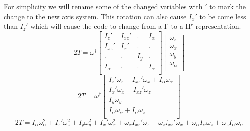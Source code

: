 \documentclass{article}
\begin{document}
For simplicity we will rename some of the changed variables with $'$ to mark the change to the new axis system. This rotation can also cause $I_{x}'$ to be come less than $I_{z}'$ which will cause the code to change from a I$^{r}$ to a II$^{r}$ representation.
\begin{equation}
	2T = \omega^{\dagger}
	\begin{bmatrix}
		I_{z}' & I_{xz}' & . & I_{\alpha} \\
		I_{xz}' & I_{x}' & . & . \\
		. & . & I_{y} & . \\
		I_{\alpha} & . & . & I_{\alpha} \\
	\end{bmatrix}
	\begin{bmatrix}
		\omega_{z} \\
		\omega_{x} \\
		\omega_{y} \\
		\omega_{\alpha} \\
	\end{bmatrix}
\end{equation}
\begin{equation}
	2T = \omega^{\dagger}
	\begin{bmatrix}
		I_{z}'\omega_{z} + I_{xz}'\omega_{x} + I_{\alpha}\omega_{\alpha} \\
		I_{x}'\omega_{x} + I_{xz}'\omega_{z} \\
		I_{y}\omega_{y} \\
		I_{\alpha}\omega_{\alpha} + I_{\alpha}\omega_{z} \\
	\end{bmatrix}
\end{equation}
\begin{equation}
	2T = I_{\alpha}\omega_{\alpha}^{2} + I_{z}'\omega_{z}^{2} + I_{y}\omega_{y}^{2} + I_{x}'\omega_{x}^{2} + \omega_{x}I_{xz}'\omega_{z} + \omega_{z}I_{xz}'\omega_{x} + \omega_{\alpha}I_{\alpha}\omega_{z} + \omega_{z}I_{\alpha}\omega_{\alpha} 	
\end{equation}
\end{document}
